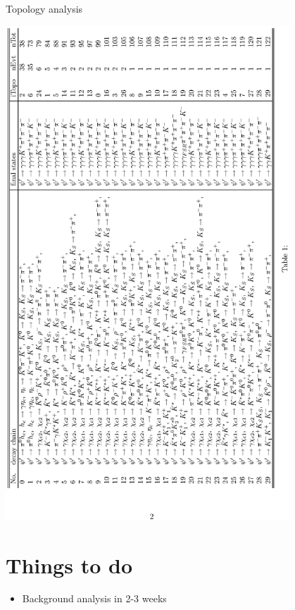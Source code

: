 \documentclass{beamer}
\begin{document}
        \begin{frame}{Topology analysis}
        \begin{center}
        \vskip -2.0cm
        \includegraphics[width=0.8\textwidth,angle=270]{figures/notice.eps}
        \end{center}
        \end{frame}
        \section{Things to do}
        \begin{frame}
        \begin{itemize}
        \item Background analysis in 2-3 weeks
        \end{itemize}
        \end{frame}
        
\end{document}
